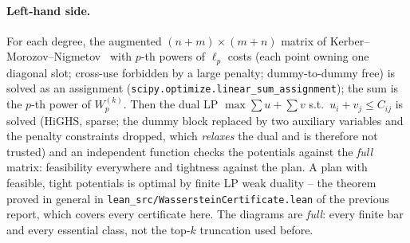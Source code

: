 \documentclass[11pt,a4paper]{article}
\newcommand{\lean}[1]{\texttt{\small #1}}
\begin{document}
\paragraph{Left-hand side.} For each degree, the augmented $(n+m)\times(m+n)$ matrix of
Kerber--Morozov--Nigmetov~\cite{Kerber2017} with $p$-th powers of $\ell_p$ costs (each point owning one
diagonal slot; cross-use forbidden by a large penalty; dummy-to-dummy free) is solved as an assignment
(\lean{scipy.optimize.linear\_sum\_assignment}); the sum is the $p$-th power of $W_p^{(k)}$. Then the
dual LP $\max\sum u+\sum v$ s.t.\ $u_i+v_j\le C_{ij}$ is solved (HiGHS, sparse; the dummy block
replaced by two auxiliary variables and the penalty constraints dropped, which \emph{relaxes} the dual
and is therefore not trusted) and an independent function checks the potentials against the
\emph{full} matrix: feasibility everywhere and tightness against the plan. A plan with feasible, tight
potentials is optimal by finite LP weak duality -- the theorem proved in general in
\lean{lean\_src/WassersteinCertificate.lean} of the previous report, which covers every certificate
here. The diagrams are \emph{full}: every finite bar and every essential class, not the top-$k$
truncation used before.
\end{document}

